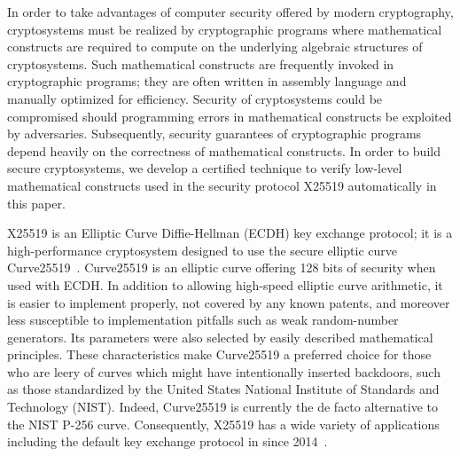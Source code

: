 
In order to take advantages of computer security offered by modern 
cryptography, 
cryptosystems must be realized by cryptographic programs where mathematical
constructs are required to compute on the underlying algebraic
structures of cryptosystems.
Such mathematical constructs are frequently invoked in cryptographic
programs; they are often written in assembly language and
manually optimized for efficiency. 
Security of cryptosystems could be compromised should programming
errors in mathematical constructs be exploited by adversaries.
Subsequently, security guarantees of cryptographic programs
depend heavily on the correctness of mathematical constructs.
In order to build secure cryptosystems, we develop a certified
technique to verify low-level mathematical constructs used in the
security protocol X25519 automatically in this paper.

X25519 is an Elliptic Curve Diffie-Hellman (ECDH) key exchange
protocol; it is a high-performance cryptosystem designed to 
use the secure elliptic curve Curve25519~\cite{Ber06}. Curve25519 is an elliptic
curve offering 128 bits of security when used with ECDH. In addition
to allowing high-speed elliptic curve arithmetic, it is easier to
implement properly, not covered by any known patents, and moreover
less susceptible to implementation pitfalls such as weak 
random-number generators. Its parameters were also selected by
easily described mathematical principles.
These characteristics make Curve25519 a
preferred choice for those who are leery of curves which might have
intentionally inserted
backdoors, such as those standardized by the United States National
Institute of Standards and Technology (NIST). 
Indeed, Curve25519 is currently the
de facto alternative to the NIST P-256 curve. Consequently, X25519 has
a wide variety of applications including the default key exchange
protocol in \openssh since 2014~\cite{W:17:C}.

